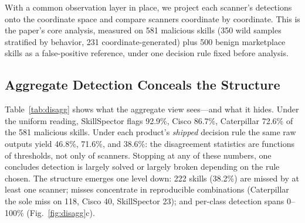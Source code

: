 \documentclass[sigconf,nonacm]{acmart}
\begin{document}
With a common observation layer in place, we project each scanner's detections onto the coordinate space and compare scanners coordinate by coordinate. This is the paper's core analysis, measured on 581 malicious skills (350 wild samples stratified by behavior, 231 coordinate-generated) plus 500 benign marketplace skills as a false-positive reference, under one decision rule fixed before analysis.

\subsection{Aggregate Detection Conceals the Structure}
Table~\ref{tab:disagg} shows what the aggregate view sees---and what it hides. Under the uniform reading, SkillSpector flags 92.9\%, Cisco 86.7\%, Caterpillar 72.6\% of the 581 malicious skills. Under each product's \emph{shipped} decision rule the same raw outputs yield 46.8\%, 71.6\%, and 38.6\%: the disagreement statistics are functions of thresholds, not only of scanners. Stopping at any of these numbers, one concludes detection is largely solved or largely broken depending on the rule chosen. The structure emerges one level down: 222 skills (38.2\%) are missed by at least one scanner; misses concentrate in reproducible combinations (Caterpillar the sole miss on 118, Cisco 40, SkillSpector 23); and per-class detection spans 0--100\% (Fig.~\ref{fig:disagg}c).
\end{document}
